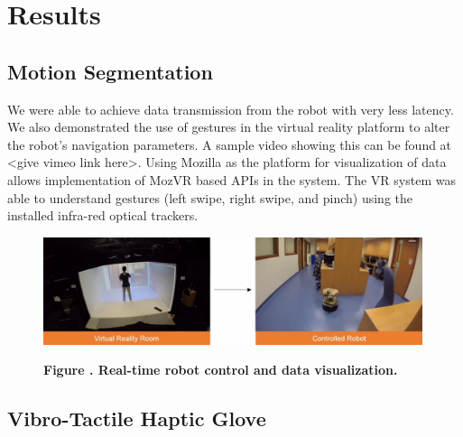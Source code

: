 \chapter{Results }
\section{Motion Segmentation}
We were able to achieve data transmission from the robot with very less latency. We also demonstrated the use of gestures in the virtual reality platform to alter the robot's navigation parameters. A sample video showing this can be found at <give vimeo link here>. Using Mozilla as the platform for visualization of data allows implementation of MozVR based APIs in the system. The VR system was able to understand gestures (left swipe, right swipe, and pinch) using the installed infra-red optical trackers.
\begin{figure}[h!]
	\begin{center}
		\includegraphics[width=0.99\textwidth]{figures/motion-seg/result}%
	\end{center}
	\textbf{\label{fig:result-motion} Figure . Real-time robot control and data visualization.} { }
\end{figure}
\section{Vibro-Tactile Haptic Glove}

